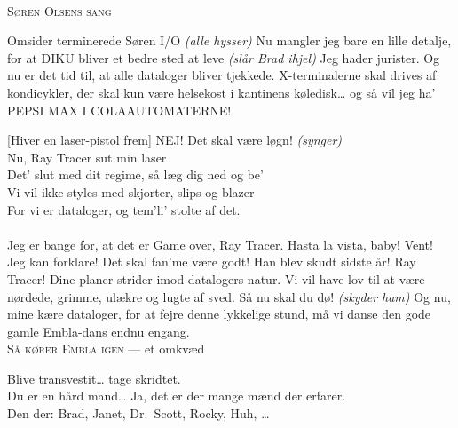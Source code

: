 \documentclass[10pt]{article}
\begin{document}
\begin{sketch}
\\
 \textsc{Søren Olsens sang}
\\

    Omsider terminerede Søren I/O \emph{(alle hysser)} Nu mangler jeg bare en
lille detalje, for at DIKU bliver et bedre sted at leve \emph{(slår Brad ihjel)}
Jeg hader jurister. Og nu er det tid til, at alle dataloger bliver
tjekkede. X-terminalerne skal drives af kondicykler, der skal kun være
helsekost i kantinens køledisk\ldots{} og så vil jeg ha' PEPSI MAX I
COLAAUTOMATERNE!


   [Hiver en laser-pistol frem] NEJ! Det skal være løgn!
        \emph{(synger)}\\
        Nu, Ray Tracer sut min laser\\
        Det' slut med dit regime, så læg dig ned og be'\\
        Vi vil ikke styles med skjorter, slips og blazer\\
        For vi er dataloger, og tem'li' stolte af det.\\
\\
Jeg er bange for, at det er Game over, Ray Tracer. Hasta la vista, baby!
    Vent! Jeg kan forklare!
  Det skal fan'me være godt! Han blev skudt sidste år!
   Ray Tracer! Dine planer strider imod datalogers natur. Vi vil have lov til at være nørdede, grimme, ulækre og lugte af sved. Så nu skal du dø! \emph{(skyder ham)} Og nu, mine kære dataloger, for at
fejre denne lykkelige stund, må vi danse den gode gamle Embla-dans endnu
engang.
\\
   \textsc{Så kører Embla igen} --- et omkvæd
\\

 Blive transvestit\ldots{} tage skridtet.\\
Du er en hård mand\ldots{} Ja,  det er der mange mænd der erfarer.\\
Den der: Brad, Janet, Dr.\ Scott, Rocky, Huh, \ldots{}



\end{sketch}
\end{document}
